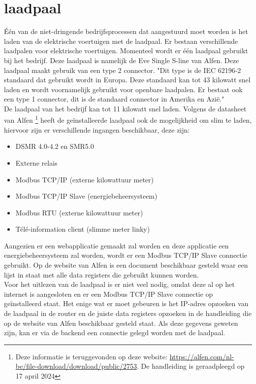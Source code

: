 \section{laadpaal}
\label{sec:stand-van-zaken-laadpaal}

Één van de niet-dringende bedrijfsprocessen dat aangestuurd moet worden is het laden van de elektrische voertuigen met de laadpaal. Er bestaan verschillende laadpalen voor elektrische voertuigen. Momenteel wordt er één laadpaal gebruikt bij het bedrijf. Deze laadpaal is namelijk de Eve Single S-line van Alfen. Deze laadpaal maakt gebruik van een type 2 connector. "Dit type is de IEC 62196-2 standaard dat gebruikt wordt in Europa. Deze standaard kan tot 43 kilowatt snel laden en wordt voornamelijk gebruikt voor openbare laadpalen. Er bestaat ook een type 1 connector, dit is de standaard connector in Amerika en Azië." \autocite{HEMAVATHI2022105013} \\

De laadpaal van het bedrijf kan tot 11 kilowatt snel laden. Volgens de datasheet van Alfen \footnote{Deze informatie is teruggevonden op deze website: \url{https://alfen.com/nl-be/file-download/download/public/2753}. De handleiding is geraadpleegd op 17 april 2024} heeft de geïnstalleerde laadpaal ook de mogelijkheid om slim te laden, hiervoor zijn er verschillende ingangen beschikbaar, deze zijn:

\begin{itemize}
    \item DSMR 4.0-4.2 en SMR5.0
    \item Externe relais
    \item Modbus TCP/IP (externe kilowattuur meter)
    \item Modbus TCP/IP Slave (energiebeheersysteem)
    \item Modbus RTU (externe kilowattuur meter)
    \item Télé-information client (slimme meter linky)
\end{itemize}

Aangezien er een webapplicatie gemaakt zal worden en deze applicatie een energiebeheersysteem zal worden, wordt er een Modbus TCP/IP Slave connectie gebruikt. Op de website van Alfen is een document beschikbaar gesteld waar een lijst in staat met alle data registers die gebruikt kunnen worden.\\

Voor het uitlezen van de laadpaal is er niet veel nodig, omdat deze al op het internet is aangesloten en er een Modbus TCP/IP Slave connectie op geïnstalleerd staat. Het enige wat er moet gebeuren is het IP-adres opzoeken van de laadpaal in de router en de juiste data registers opzoeken in de handleiding die op de website van Alfen beschikbaar gesteld staat. Als deze gegevens geweten zijn, kan er via de backend een connectie gelegd worden met de laadpaal.\\

